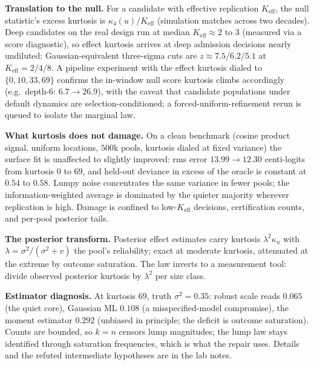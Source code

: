 \documentclass[11pt]{article}
\begin{document}
\textbf{Translation to the null.} For a candidate with effective
replication $K_{\mathrm{eff}}$, the null statistic's excess kurtosis is
$\kappa_4(u)/K_{\mathrm{eff}}$ (simulation matches across two decades).
Deep candidates on the real design run at median $K_{\mathrm{eff}}
\approx 2$ to $3$ (measured via a score diagnostic), so effect kurtosis
arrives at deep admission decisions nearly undiluted:
Gaussian-equivalent three-sigma cuts are $z \approx 7.5 / 6.2 / 5.1$ at
$K_{\mathrm{eff}} = 2/4/8$. A pipeline experiment with the effect
kurtosis dialed to $\{0, 10, 33, 69\}$ confirms the in-window null
score kurtosis climbs accordingly (e.g.\ depth-6: $6.7 \to 26.9$),
with the caveat that candidate populations under default dynamics are
selection-conditioned; a forced-uniform-refinement rerun is queued to
isolate the marginal law.

\textbf{What kurtosis does not damage.} On a clean benchmark (cosine
product signal, uniform locations, $500$k pools, kurtosis dialed at
fixed variance) the surface fit is unaffected to slightly improved:
rms error $13.99 \to 12.30$ centi-logits from kurtosis $0$ to $69$, and
held-out deviance in excess of the oracle is constant at $0.54$ to
$0.58$. Lumpy noise concentrates the same variance in fewer pools; the
information-weighted average is dominated by the quieter majority
wherever replication is high. Damage is confined to low-$K_{\mathrm{eff}}$
decisions, certification counts, and per-pool posterior tails.

\textbf{The posterior transform.} Posterior effect estimates carry
kurtosis $\lambda^2 \kappa_u$ with $\lambda = \sigma^2/(\sigma^2 + v)$
the pool's reliability; exact at moderate kurtosis, attenuated at the
extreme by outcome saturation. The law inverts to a measurement tool:
divide observed posterior kurtosis by $\lambda^2$ per size class.

\textbf{Estimator diagnosis.} At kurtosis
$69$, truth $\sigma^2 = 0.35$: robust scale reads $0.065$ (the quiet
core), Gaussian ML $0.108$ (a misspecified-model compromise), the
moment estimator $0.292$ (unbiased in principle; the deficit is outcome
saturation). Counts are bounded, so $k = n$ censors lump magnitudes;
the lump law stays identified through saturation frequencies, which is
what the repair uses. Details and the refuted intermediate hypotheses
are in the lab notes.
\end{document}
